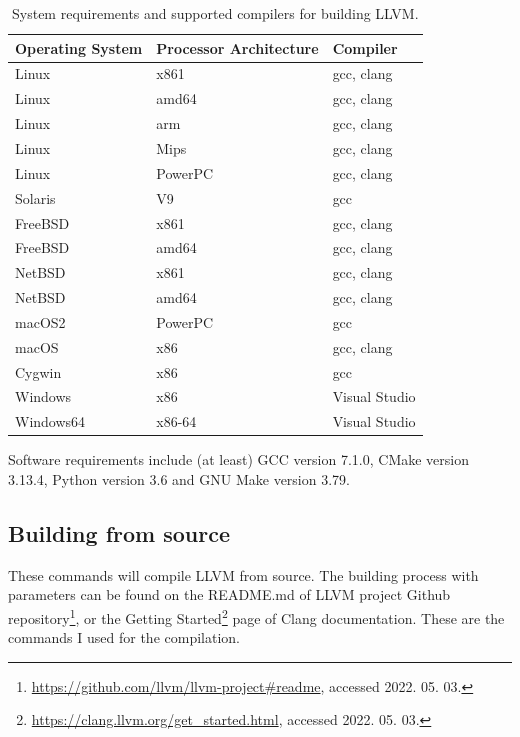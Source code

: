 \begin{table}[H]
	\centering
	\begin{tabular}{ | m{} | m{} | m{} | }
		\hline
		\textbf{Operating System} & \textbf{Processor Architecture} & \textbf{Compiler} \\
		\hline \hline
		Linux & x861 & gcc, clang \\
		\hline
		Linux & amd64 & gcc, clang \\
		\hline
		Linux & arm & gcc, clang \\
		\hline
		Linux & Mips & gcc, clang \\
		\hline
		Linux & PowerPC & gcc, clang \\
		\hline
		Solaris & V9 & gcc \\
		\hline
		FreeBSD & x861 & gcc, clang \\
		\hline
		FreeBSD & amd64 & gcc, clang \\
		\hline
		NetBSD & x861 & gcc, clang \\
		\hline
		NetBSD & amd64 & gcc, clang \\
		\hline
		macOS2 & PowerPC & gcc \\
		\hline
		macOS & x86 & gcc, clang \\
		\hline
		Cygwin & x86 & gcc \\
		\hline
		Windows & x86 & Visual Studio \\
		\hline
		Windows64 & x86-64 & Visual Studio \\
		\hline
	\end{tabular}
	\caption{System requirements and supported compilers for building LLVM.}
	\label{tab:clang req}
\end{table}

Software requirements include (at least) GCC version 7.1.0, CMake version 3.13.4, Python version 3.6 and GNU Make version 3.79.

\subsection{Building from source}

These commands will compile LLVM from source. The building process with parameters can be found on the README.md of
LLVM project Github repository\footnote{\url{https://github.com/llvm/llvm-project#readme}, accessed 2022. 05. 03.}, or the Getting
Started\footnote{\url{https://clang.llvm.org/get_started.html}, accessed 2022. 05. 03.} page of Clang documentation. These are the commands I used for
the compilation.

